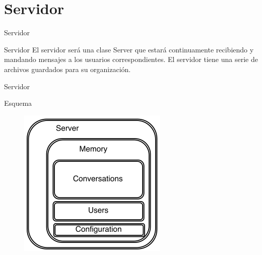 \section{Servidor}

\begin{frame}{Servidor}
	\begin{block}{Servidor}
		El servidor será una clase Server que estará continuamente recibiendo y mandando mensajes a los usuarios correspondientes. El servidor tiene una serie de archivos guardados para su organización.
	\end{block}
\end{frame}




\begin{frame}{Servidor}
	\begin{exampleblock}{Esquema}
		\begin{figure}[H]
    		\includegraphics[scale=0.7]{./Imagenes/server.png}
		\end{figure}
	\end{exampleblock}
\end{frame}

